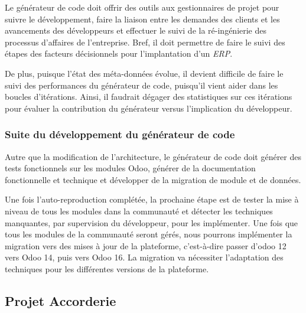 Le générateur de code doit offrir des outils aux gestionnaires de projet pour suivre le développement, faire la liaison entre les demandes des clients et les avancements des développeurs et effectuer le suivi de la ré-ingénierie des processus d'affaires de l'entreprise. Bref, il doit permettre de faire le suivi des étapes des facteurs décisionnels pour l'implantation d'un \textit{ERP}.

De plus, puisque l’état des méta-données évolue, il devient difficile de faire le suivi des performances du générateur de code, puisqu’il vient aider dans les boucles d’itérations. Ainsi, il faudrait dégager des statistiques sur ces itérations pour évaluer la contribution du générateur versus l'implication du développeur.


\subsubsection{Suite du développement du générateur de code}

Autre que la modification de l'architecture, le générateur de code doit générer des tests fonctionnels sur les modules Odoo, générer de la documentation fonctionnelle et technique et développer de la migration de module et de données.


Une fois l'auto-reproduction complétée, la prochaine étape est de tester la mise à niveau de tous les modules dans la communauté et détecter les techniques manquantes, par supervision du développeur, pour les implémenter. Une fois que tous les modules de la communauté seront gérés, nous pourrons implémenter la migration vers des mises à jour de la plateforme, c’est-à-dire passer d'odoo 12 vers Odoo 14, puis vers Odoo 16. La migration va nécessiter l'adaptation des techniques pour les différentes versions de la plateforme.


\subsection{Projet Accorderie}

